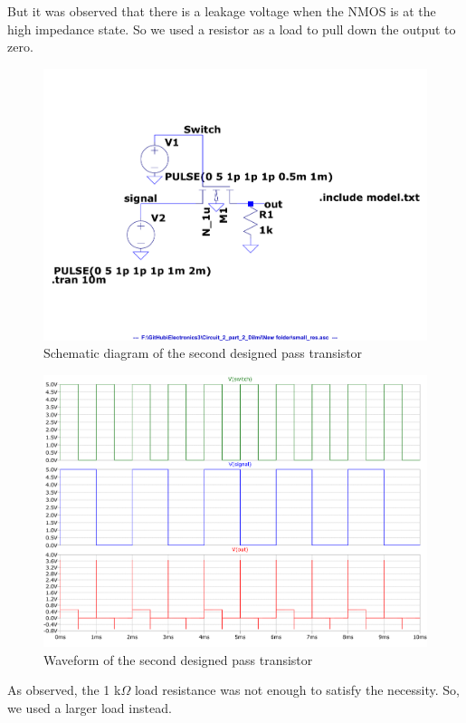 \documentclass[a4paper,11pt]{article}%
\begin{document}
But it was observed that there is a leakage voltage when the NMOS is at the high impedance state. So we used a resistor as a load to pull down the output to zero.

\begin{figure}[H]
	\centering
	\includegraphics[scale=0.5]{figures/2part2/small_res_cct.pdf}
	\caption{Schematic diagram of the second designed pass transistor}
\end{figure}
\begin{figure}[H]
	\centering
	\includegraphics[scale=0.5]{figures/2part2/small_res_wave.pdf}
	\caption{Waveform of the second designed pass transistor}
\end{figure}

As observed, the 1 k$\Omega$ load resistance was not enough to satisfy the necessity. So, we used a larger load instead.
\end{document}
